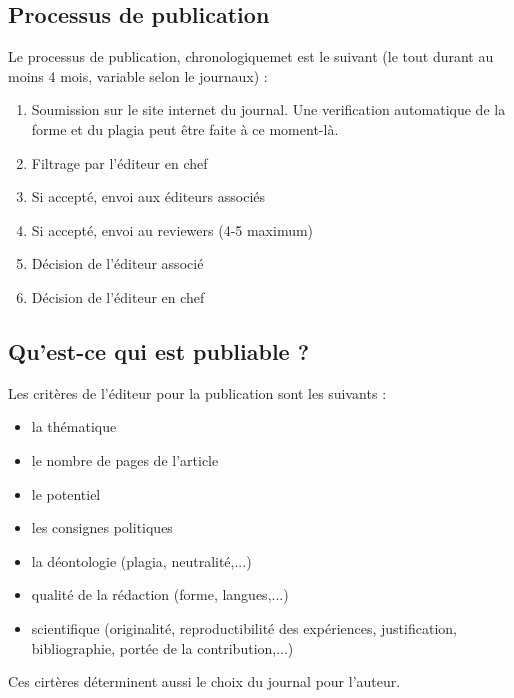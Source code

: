\documentclass[12pt]{article}
\begin{document}
\subsection{Processus de publication}
Le processus de publication, chronologiquemet est le suivant (le tout durant au moins 4 mois, variable selon le journaux) : 
\begin{enumerate}
	\item Soumission sur le site internet du journal. Une verification automatique de la forme et du plagia peut être faite à ce moment-là.
	\item Filtrage par l'éditeur en chef
	\item Si accepté, envoi aux éditeurs associés
	\item Si accepté, envoi au reviewers (4-5 maximum)
	\item Décision de l'éditeur associé
	\item Décision de l'éditeur en chef
\end{enumerate}

\subsection{Qu'est-ce qui est publiable ?}
Les critères de l'éditeur pour la publication sont les suivants : 
\begin{multicols}{2}
	\begin{itemize}
	    \item la thématique
	    \item le nombre de pages de l'article
	    \item le potentiel
	    \item les consignes politiques
	    \item la déontologie (plagia, neutralité,...) \columnbreak
	    \item qualité de la rédaction (forme, langues,...)
	    \item scientifique (originalité, reproductibilité des expériences, justification, bibliographie, portée de la contribution,...)
	\end{itemize}
\end{multicols}
Ces cirtères déterminent aussi le choix du journal pour l'auteur.
\end{document}
